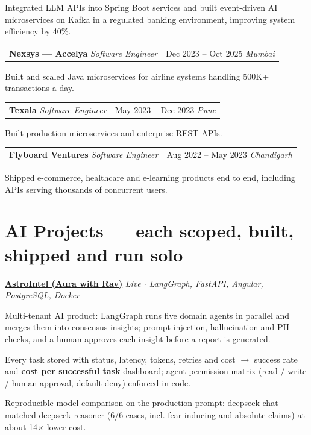 \documentclass[10pt, letterpaper]{article}
\makeatletter
\newcommand{\resumeitem}[1]{\item\small{#1}}
\newcommand{\jobheading}[4]{%
  \noindent
  \begin{tabularx}{\textwidth}{@{}X r@{}}
    \textbf{\color{primary}#1} \textbar{} \textit{\small\color{subtle}#2} &
    \small\color{subtle}#3 \textbar{} \textit{\small #4}
  \end{tabularx}%
}
\makeatother
\begin{document}
\begin{jobitems}
\resumeitem{Integrated LLM APIs into Spring Boot services and built event-driven AI microservices on Kafka in a regulated banking environment, improving system efficiency by 40\%.}
\end{jobitems}

\jobheading{Nexsys --- Accelya}{Software Engineer}{Dec 2023 -- Oct 2025}{Mumbai}

\begin{jobitems}
\resumeitem{Built and scaled Java microservices for airline systems handling 500K+ transactions a day.}
\end{jobitems}

\jobheading{Texala}{Software Engineer}{May 2023 -- Dec 2023}{Pune}

\begin{jobitems}
\resumeitem{Built production microservices and enterprise REST APIs.}
\end{jobitems}

\jobheading{Flyboard Ventures}{Software Engineer}{Aug 2022 -- May 2023}{Chandigarh}

\begin{jobitems}
\resumeitem{Shipped e-commerce, healthcare and e-learning products end to end, including APIs serving thousands of concurrent users.}
\end{jobitems}

\section{AI Projects \textnormal{\small\color{subtle}--- each scoped, built, shipped and run solo}}

\noindent\href{https://aurawithrav.com}{\textbf{AstroIntel (Aura with Rav)}} \hfill \textit{\small\color{subtle}Live $\cdot$ LangGraph, FastAPI, Angular, PostgreSQL, Docker}

\begin{projectitems}
\resumeitem{Multi-tenant AI product: LangGraph runs five domain agents in parallel and merges them into consensus insights; prompt-injection, hallucination and PII checks, and a human approves each insight before a report is generated.}
\resumeitem{Every task stored with status, latency, tokens, retries and cost $\rightarrow$ success rate and \textbf{cost per successful task} dashboard; agent permission matrix (read / write / human approval, default deny) enforced in code.}
\resumeitem{Reproducible model comparison on the production prompt: deepseek-chat matched deepseek-reasoner (6/6 cases, incl. fear-inducing and absolute claims) at about 14$\times$ lower cost.}
\end{projectitems}
\end{document}
